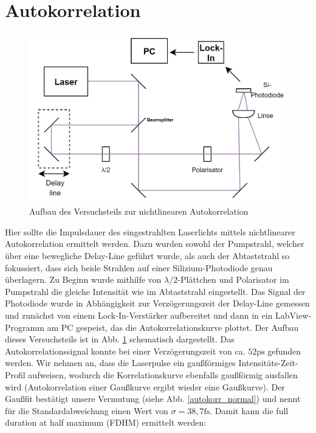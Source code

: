 

\section{Autokorrelation}
\begin{figure}[H]
	\begin{center}
		\includegraphics[width=14cm]{Abb/autokorr_aufbau.png}
		\caption{Aufbau des Versuchsteils zur nichtlinearen Autokorrelation}
		\label{autokorr_aufbau}
	\end{center}
\end{figure}

Hier sollte die Impulsdauer des eingestrahlten Laserlichts mittels nichtlinearer Autokorrelation ermittelt werden. Dazu wurden sowohl der Pumpstrahl, welcher über eine bewegliche Delay-Line geführt wurde, als auch der Abtaststrahl so fokussiert, dass sich beide Strahlen auf einer Silizium-Photodiode genau überlagern. Zu Beginn wurde mithilfe von $\lambda/2$-Plättchen und Polarisator im Pumpstrahl die gleiche Intensität wie im Abtaststrahl eingestellt. Das Signal der Photodiode wurde in Abhängigkeit zur Verzögerungszeit der Delay-Line gemessen und zunächst von einem Lock-In-Verstärker aufbereitet und dann in ein LabView-Programm am PC gespeist, das die Autokorrelationskurve plottet. Der Aufbau dieses Versuchsteils ist in Abb. \ref{autokorr_aufbau} schematisch dargestellt.
Das Autokorrelationssignal konnte bei einer Verzögerungszeit von ca. $52 \si{\pico\second}$ gefunden werden. Wir nehmen an, dass die Laserpulse ein gaußförmiges Intensitäts-Zeit-Profil aufweisen, wodurch die Korrelationskurve ebenfalls gaußförmig ausfallen wird (Autokorrelation einer Gaußkurve ergibt wieder eine Gaußkurve). Der Gaußfit bestätigt unsere Vermutung (siehe Abb. \ref{autokorr_normal}) und nennt für die Standardabweichung einen Wert von $\sigma=38,7\si{\femto\second}$. Damit kann die full duration at half maximum (FDHM) ermittelt werden:


